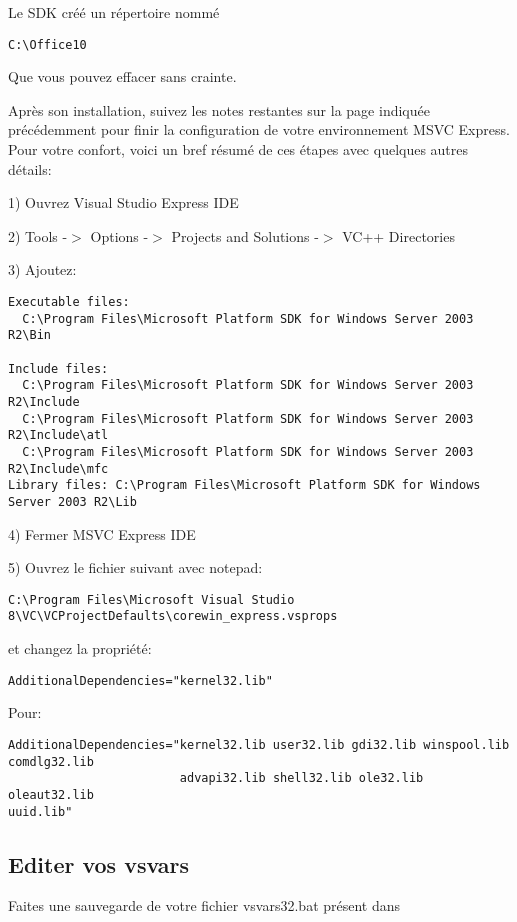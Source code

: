 Le SDK créé un répertoire nommé

\begin{verbatim}
C:\Office10
\end{verbatim}

Que vous pouvez effacer sans crainte.

Après son installation, suivez les notes restantes sur la page indiquée précédemment pour finir la configuration de votre environnement MSVC Express. Pour votre confort, voici un bref résumé de ces étapes avec quelques autres détails:

1) Ouvrez Visual Studio Express IDE

2) Tools -$>$ Options -$>$ Projects and Solutions -$>$ VC++ Directories

3) Ajoutez:

\begin{verbatim}
Executable files: 
  C:\Program Files\Microsoft Platform SDK for Windows Server 2003 R2\Bin

Include files: 
  C:\Program Files\Microsoft Platform SDK for Windows Server 2003 R2\Include
  C:\Program Files\Microsoft Platform SDK for Windows Server 2003 R2\Include\atl
  C:\Program Files\Microsoft Platform SDK for Windows Server 2003 R2\Include\mfc
Library files: C:\Program Files\Microsoft Platform SDK for Windows Server 2003 R2\Lib
\end{verbatim}

4) Fermer MSVC Express IDE

5) Ouvrez le fichier suivant avec notepad:

\begin{verbatim}
C:\Program Files\Microsoft Visual Studio
8\VC\VCProjectDefaults\corewin_express.vsprops
\end{verbatim}

et changez la propriété:

\begin{verbatim}
AdditionalDependencies="kernel32.lib"
\end{verbatim}

Pour:

\begin{verbatim}
AdditionalDependencies="kernel32.lib user32.lib gdi32.lib winspool.lib
comdlg32.lib 
                        advapi32.lib shell32.lib ole32.lib oleaut32.lib
uuid.lib"
\end{verbatim}

\subsection{Editer vos vsvars}
Faites une sauvegarde de votre fichier vsvars32.bat présent dans

